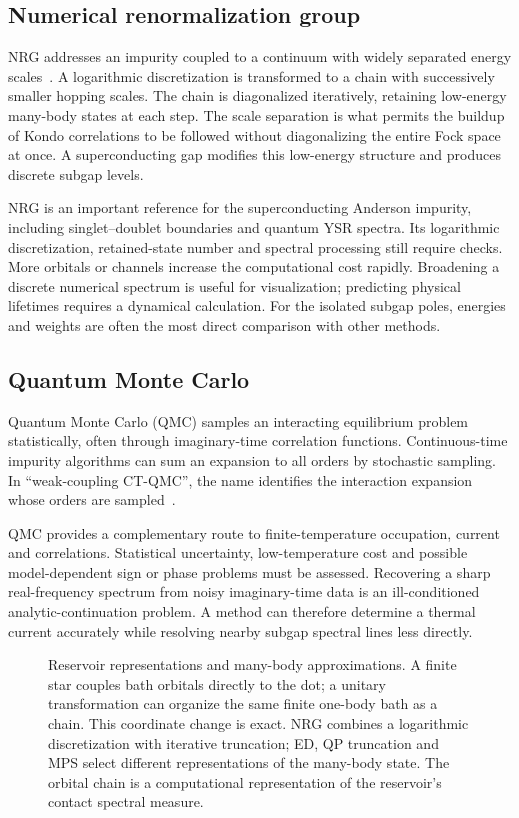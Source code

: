 \subsection{Numerical renormalization group}

NRG addresses an impurity coupled to a continuum with widely separated energy
scales~\cite{wilson1975renormalization,bulla2008numerical}. A logarithmic
discretization is transformed to a chain with successively smaller hopping
scales. The chain is diagonalized iteratively, retaining low-energy many-body
states at each step. The scale separation is what permits the buildup of Kondo
correlations to be followed without diagonalizing the entire Fock space at once.
A superconducting gap modifies this low-energy structure and produces discrete
subgap levels.

NRG is an important reference for the superconducting Anderson impurity,
including singlet--doublet boundaries and quantum YSR spectra. Its logarithmic
discretization, retained-state number and spectral processing still require
checks. More orbitals or channels increase the computational cost rapidly.
Broadening a discrete numerical spectrum is useful for visualization; predicting
physical lifetimes requires a dynamical calculation. For the isolated subgap poles, energies and
weights are often the most direct comparison with other methods.

\subsection{Quantum Monte Carlo}

Quantum Monte Carlo (QMC) samples an interacting equilibrium problem statistically,
often through imaginary-time correlation functions. Continuous-time impurity
algorithms can sum an expansion to all orders by stochastic sampling. In
``weak-coupling CT-QMC'', the name identifies the interaction expansion whose
orders are sampled~\cite{gull2011continuous}.

QMC provides a complementary route to finite-temperature occupation, current and
correlations. Statistical uncertainty, low-temperature cost and possible
model-dependent sign or phase problems must be assessed. Recovering a sharp
real-frequency spectrum from noisy imaginary-time data is an ill-conditioned
analytic-continuation problem. A method can therefore determine a thermal
current accurately while resolving nearby subgap spectral lines less directly.

\begin{figure}[htb]
\centering{}
\caption{Reservoir representations and many-body approximations. A finite star
couples bath orbitals directly to the dot; a unitary transformation can organize
the same finite one-body bath as a chain. This coordinate change is exact.
NRG combines a logarithmic discretization with iterative
truncation; ED, QP truncation and MPS select different representations of the
many-body state. The orbital chain is a computational representation of the
reservoir's contact spectral measure.}
\label{fig:primer-methods}
\end{figure}

